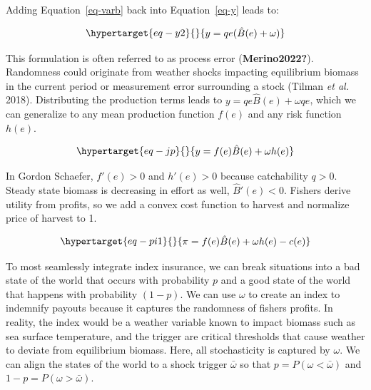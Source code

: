\documentclass[
  letterpaper,
  DIV=11,
  numbers=noendperiod]{scrartcl}
\theoremstyle{plain}
\theoremstyle{plain}
\theoremstyle{remark}
\begin{document}
Adding Equation~\ref{eq-varb} back into Equation~\ref{eq-y} leads to:

\begin{equation}\protect\hypertarget{eq-y2}{}{
\begin{aligned}
y=qe(\hat{B}(e)+\omega)
\end{aligned}
}\label{eq-y2}\end{equation}

This formulation is often referred to as process error
(\textbf{Merino2022?}). Randomness could originate from weather shocks
impacting equilibrium biomass in the current period or measurement error
surrounding a stock (Tilman \emph{et al.} 2018). Distributing the
production terms leads to \(y=qe\hat{B}(e)+\omega qe\), which we can
generalize to any mean production function \(f(e)\) and any risk
function \(h(e)\).

\begin{equation}\protect\hypertarget{eq-jp}{}{
\begin{aligned}
y=f(e)\hat{B}(e)+\omega h(e)
\end{aligned}
}\label{eq-jp}\end{equation}

In Gordon Schaefer, \(f'(e)>0\) and \(h'(e)>0\) because catchability
\(q>0\). Steady state biomass is decreasing in effort as well,
\(\hat{B}'(e)<0\). Fishers derive utility from profits, so we add a
convex cost function to harvest and normalize price of harvest to 1.

\begin{equation}\protect\hypertarget{eq-pi1}{}{
\begin{aligned}
\pi=f(e)\hat{B}(e)+\omega h(e)-c(e)
\end{aligned}
}\label{eq-pi1}\end{equation}

To most seamlessly integrate index insurance, we can break situations
into a bad state of the world that occurs with probability \(p\) and a
good state of the world that happens with probability \((1-p)\). We can
use \(\omega\) to create an index to indemnify payouts because it
captures the randomness of fishers profits. In reality, the index would
be a weather variable known to impact biomass such as sea surface
temperature, and the trigger are critical thresholds that cause weather
to deviate from equilibrium biomass. Here, all stochasticity is captured
by \(\omega\). We can align the states of the world to a shock trigger
\(\bar\omega\) so that \(p=P(\omega<\bar\omega)\) and
\(1-p=P(\omega>\bar\omega)\).
\end{document}
